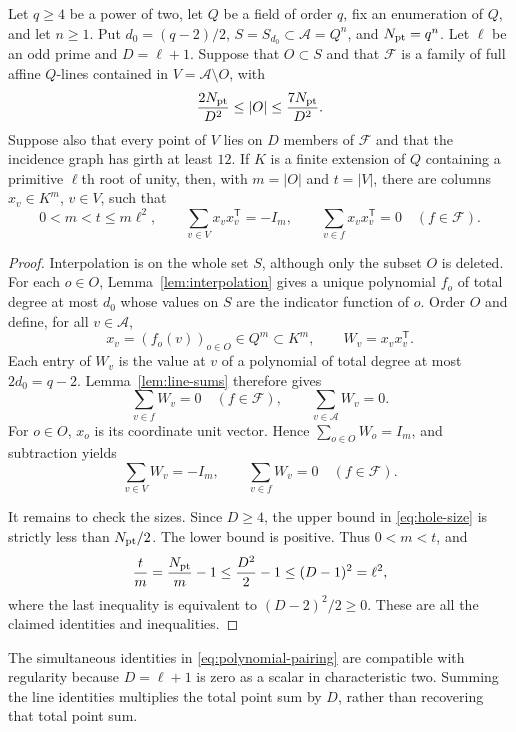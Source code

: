 \begin{proposition}
\label{prop:pairing}
Let $q\ge4$ be a power of two, let $Q$ be a field of order $q$, fix an enumeration of $Q$, and let $n\ge1$. Put $d_0=(q-2)/2$, $S=S_{d_0}\subset\mathcal A=Q^n$, and $N_{\rm pt}=q^n$. Let $\ell$ be an odd prime and $D=\ell+1$. Suppose that $O\subset S$ and that $\mathcal F$ is a family of full affine $Q$-lines contained in $V=\mathcal A\setminus O$, with
\begin{equation}
\label{eq:hole-size}
\frac{2N_{\rm pt}}{D^2}\le |O|\le\frac{7N_{\rm pt}}{D^2}.
\end{equation}
Suppose also that every point of $V$ lies on $D$ members of $\mathcal F$ and that the incidence graph has girth at least $12$. If $K$ is a finite extension of $Q$ containing a primitive $\ell$th root of unity, then, with $m=|O|$ and $t=|V|$, there are columns $x_v\in K^m$, $v\in V$, such that
\[
0<m<t\le m\ell^2,\qquad
\sum_{v\in V}x_vx_v^{\mathsf T}=-I_m,\qquad
\sum_{v\in f}x_vx_v^{\mathsf T}=0\quad(f\in\mathcal F).
\]
\end{proposition}
\begin{proof}
Interpolation is on the whole set $S$, although only the subset $O$ is
deleted. For each $o\in O$, Lemma~\ref{lem:interpolation} gives a unique
polynomial $f_o$ of total degree at most $d_0$ whose values on $S$ are
the indicator function of $o$. Order $O$ and define, for all
$v\in\mathcal A$,
\[
x_v=(f_o(v))_{o\in O}\in Q^m\subset K^m,
\qquad W_v=x_vx_v^{\mathsf T}.
\]
Each entry of $W_v$ is the value at $v$ of a polynomial of total degree at most $2d_0=q-2$. Lemma~\ref{lem:line-sums} therefore gives
\[
\sum_{v\in f}W_v=0\quad(f\in\mathcal F),
\qquad \sum_{v\in\mathcal A}W_v=0.
\]
For $o\in O$, $x_o$ is its coordinate unit vector. Hence $\sum_{o\in O}W_o=I_m$, and subtraction yields
\begin{equation}
\label{eq:polynomial-pairing}
\sum_{v\in V}W_v=-I_m,
\qquad \sum_{v\in f}W_v=0\quad(f\in\mathcal F).
\end{equation}

It remains to check the sizes. Since $D\ge4$, the upper bound in \eqref{eq:hole-size} is strictly less than $N_{\rm pt}/2$. The lower bound is positive. Thus $0<m<t$, and
\[
\frac{t}{m}=\frac{N_{\rm pt}}{m}-1
\le\frac{D^2}{2}-1\le(D-1)^2=\ell^2,
\]
where the last inequality is equivalent to $(D-2)^2/2\ge0$. These are all the claimed identities and inequalities.
\end{proof}

\begin{remark}
The simultaneous identities in \eqref{eq:polynomial-pairing} are compatible with regularity because $D=\ell+1$ is zero as a scalar in characteristic two. Summing the line identities multiplies the total point sum by $D$, rather than recovering that total point sum.
\end{remark}
